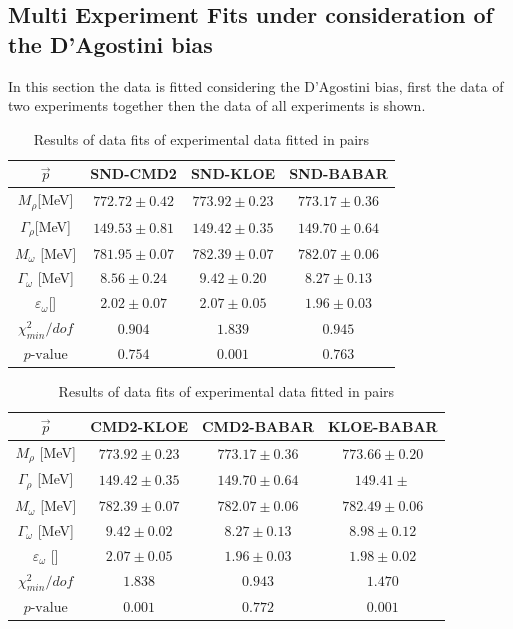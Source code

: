 \documentclass[a4paper]{article}
\begin{document}
\subsection{Multi Experiment Fits under consideration of the D'Agostini bias}
In this section the data is fitted considering the D'Agostini bias, first the data of
two experiments together then the data of all experiments is shown.

\begin{table}[H]
    \caption{Results of data fits of experimental data fitted in pairs\label{tabtwo1}}
    \centering
    \begin{tabular}{|c|c|c|c|}
        \hline
        $\vec{p}$ & SND-CMD2 & SND-KLOE & SND-BABAR  \\ \hline
        $M_{\rho}$[MeV]              & $772.72	\pm 0.42$ & $773.92	\pm 0.23$ &$773.17	\pm 0.36 $ \\
        $\Gamma_{\rho}$[MeV]         & $149.53	\pm 0.81$ & $149.42	\pm 0.35$ &$149.70	\pm 0.64 $\\
        $M_{\omega}$  [MeV]          & $781.95	\pm 0.07$ & $782.39	\pm 0.07$ &$782.07	\pm 0.06 $\\
        $\Gamma_{\omega}$ [MeV]      & $8.56	\pm 0.24    $ & $9.42	\pm 0.20$ &$8.27	\pm 0.13 $\\
        $\varepsilon_{\omega}$[]  & $2.02	\pm 0.07    $ & $2.07	\pm 0.05$ &$1.96	\pm 0.03 $\\
        \hline \hline
        $\chi^2_{min}/dof$      & $0.904$&$ 1.839$&$ 0.945$\\
        $p\text{-value}$        & $0.754$&$ 0.001$&$ 0.763$\\
        \hline

    \end{tabular}
\end{table}


\begin{table}[H]
    \caption{Results of data fits of experimental data fitted in pairs\label{tabtwo2}}
    \centering
    \begin{tabular}{|c|c|c|c|}
        \hline
        $\vec{p}$ & CMD2-KLOE & CMD2-BABAR & KLOE-BABAR  \\ \hline
        $M_{\rho}$        [MeV]      & $773.92	\pm 0.23$ & $773.17	\pm 0.36$ &$773.66	\pm 0.20 $ \\
        $\Gamma_{\rho}$     [MeV]    & $149.42	\pm 0.35$ & $149.70	\pm 0.64$ &$149.41	\pm  $\\        $M_{\omega}$         [MeV]   & $782.39	\pm 0.07$ & $782.07	\pm 0.06$ &$782.49	\pm 0.06 $\\
        $\Gamma_{\omega}$    [MeV]   & $9.42	\pm 0.02    $ & $8.27	\pm 0.13$ &$8.98	\pm 0.12 $\\
        $\varepsilon_{\omega}$ [] & $2.07	\pm 0.05    $ & $1.96	\pm 0.03$ &$1.98	\pm 0.02 $\\
        \hline \hline
        $\chi^2_{min}/dof$      & $1.838$&$ 0.943$&$ 1.470$\\
        $p\text{-value}$        & $0.001$&$ 0.772$&$ 0.001$\\
        \hline

    \end{tabular}
\end{table}
\end{document}

